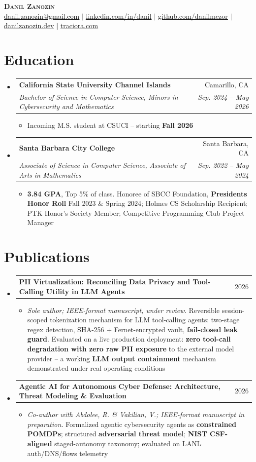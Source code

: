 \documentclass[letterpaper,11pt]{article}
\makeatletter
\newcommand{\resumeItem}[1]{
  \item\small{
    {#1 \vspace{-2pt}}
  }
}
\newcommand{\resumeSubheading}[4]{
  \vspace{-2pt}\item
    \begin{tabular*}{0.97\textwidth}[t]{l@{\extracolsep{\fill}}r}
      \textbf{#1} & #2 \\
      \textit{\small#3} & \textit{\small #4} \\
    \end{tabular*}\vspace{-7pt}
}
\newcommand{\resumeProjectHeading}[2]{
    \item
    \begin{tabular*}{0.97\textwidth}{l@{\extracolsep{\fill}}r}
      \small#1 & #2 \\
    \end{tabular*}\vspace{-7pt}
}
\newcommand{\resumeSubHeadingListStart}{\begin{itemize}[leftmargin=0.15in, label={}]}
\newcommand{\resumeSubHeadingListEnd}{\end{itemize}}
\newcommand{\resumeItemListStart}{\begin{itemize}}
\newcommand{\resumeItemListEnd}{\end{itemize}\vspace{-5pt}}
\makeatother
\begin{document}
\begin{center}
    \textbf{\Huge \scshape Danil Zanozin} \\ \vspace{2pt}
    \small \href{mailto:danil.zanozin@gmail.com}{\underline{danil.zanozin@gmail.com}} $|$
    \href{https://linkedin.com/in/danil-zanozin-603878199}{\underline{linkedin.com/in/danil}} $|$
    \href{https://github.com/danilmezor}{\underline{github.com/danilmezor}} $|$
    \href{https://danilzanozin.dev}{\underline{danilzanozin.dev}} $|$
    \href{https://traciora.com}{\underline{traciora.com}}
\end{center}


\section{Education}
  \resumeSubHeadingListStart
    \resumeSubheading
      {California State University Channel Islands}{Camarillo, CA}
      {Bachelor of Science in Computer Science, Minors in Cybersecurity and Mathematics}{Sep. 2024 -- May 2026}
      \resumeItemListStart
        \resumeItem{Incoming M.S. student at CSUCI -- starting \textbf{Fall 2026}}
      \resumeItemListEnd
    \resumeSubheading
      {Santa Barbara City College}{Santa Barbara, CA}
      {Associate of Science in Computer Science, Associate of Arts in Mathematics}{Sep. 2022 -- May 2024}
      \resumeItemListStart
        \resumeItem{\textbf{3.84 GPA}, Top 5\% of class. Honoree of SBCC Foundation, \textbf{Presidents Honor Roll} Fall 2023 \& Spring 2024; Holmes CS Scholarship Recipient; PTK Honor's Society Member; Competitive Programming Club Project Manager}
      \resumeItemListEnd
  \resumeSubHeadingListEnd


\section{Publications}
  \resumeSubHeadingListStart
    \resumeProjectHeading
        {\textbf{PII Virtualization: Reconciling Data Privacy and Tool-Calling Utility in LLM Agents}}{2026}
        \resumeItemListStart
          \resumeItem{\emph{Sole author; IEEE-format manuscript, under review.} Reversible session-scoped tokenization mechanism for LLM tool-calling agents: two-stage regex detection, SHA-256 + Fernet-encrypted vault, \textbf{fail-closed leak guard}. Evaluated on a live production deployment: \textbf{zero tool-call degradation with zero raw PII exposure} to the external model provider -- a working \textbf{LLM output containment} mechanism demonstrated under real operating conditions}
        \resumeItemListEnd
    \resumeProjectHeading
        {\textbf{Agentic AI for Autonomous Cyber Defense: Architecture, Threat Modeling \& Evaluation}}{2026}
        \resumeItemListStart
          \resumeItem{\emph{Co-author with Abdolee, R. \& Vakilian, V.; IEEE-format manuscript in preparation.} Formalized agentic cybersecurity agents as \textbf{constrained POMDPs}; structured \textbf{adversarial threat model}; \textbf{NIST CSF-aligned} staged-autonomy taxonomy; evaluated on LANL auth/DNS/flows telemetry}
        \resumeItemListEnd
  \resumeSubHeadingListEnd
\end{document}
